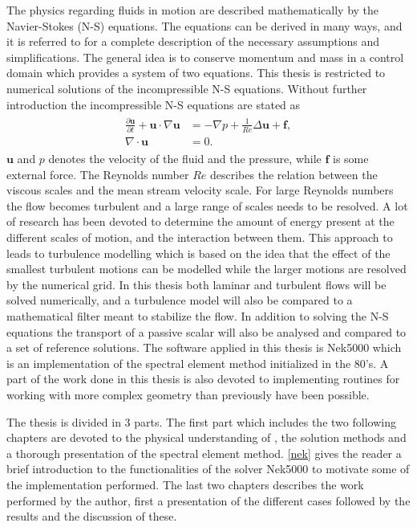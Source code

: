 The physics regarding fluids in motion are described mathematically by the Navier-Stokes (N-S) equations. 
The equations can be derived in many ways, and it is referred to \cite{White} for a complete 
description of the necessary assumptions and simplifications.
The general idea is to conserve momentum and mass in a control domain which provides a system of two equations.
This thesis is restricted to numerical solutions of the incompressible N-S equations.
Without further introduction the incompressible N-S equations are stated as  
%
\begin{align}
    \begin{split}
    \frac{\partial \mathbf{u}}{\partial t} + \mathbf{u}\cdot \nabla\mathbf{u} &= 
    -\nabla p + \frac{1}{Re} \Delta\mathbf{u} + \mathbf{f}, \\
		\nabla \cdot \mathbf{u} &= 0.
    \end{split}
	\label{eq:NS}
\end{align}
%
$\mathbf{u}$ and $p$ denotes the velocity of the fluid and the pressure, while $\mathbf{f}$ is some external force. 
The Reynolds number $Re$ describes the relation between the viscous scales and the mean stream velocity scale.
For large Reynolds numbers the flow becomes turbulent and a large range of scales needs to be resolved. A lot 
of research has been devoted to determine the amount of energy present at the different scales of motion, and 
the interaction between them. This approach to  leads to turbulence modelling which is based on the 
idea that the effect of the smallest turbulent motions can be modelled while the larger motions are resolved by 
the numerical grid. 
In this thesis both laminar and turbulent flows will be solved numerically, and a turbulence model will also 
be compared to a mathematical filter meant to stabilize the flow. In addition to solving the N-S equations the 
transport of a passive scalar will also be analysed and compared to a set of reference solutions. 
The software applied in this thesis is Nek5000 which is an implementation of the spectral element method initialized in the 80's.
A part of the work done in this thesis is also devoted to implementing routines for working with more complex geometry than previously 
have been possible. 

The thesis is divided in 3 parts. The first part which includes the two following chapters are devoted to the physical understanding 
of , the solution methods and a thorough presentation of the spectral element method. \cref{nek} gives the reader a brief 
introduction to the functionalities of the solver Nek5000 to motivate some of the implementation performed. The last two chapters 
describes the work performed by the author, first a presentation of the different cases followed by the results and the discussion
of these.

